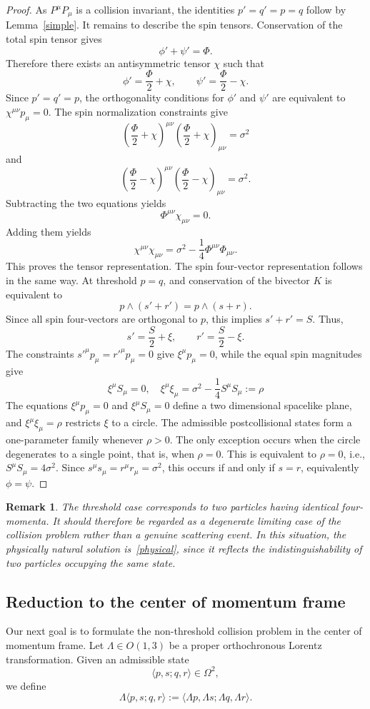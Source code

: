 \documentclass[10pt,a4paper]{amsart}
\newtheorem{remark}[theorem]{Remark}
\begin{document}
\begin{proof}
As $P^\mu P_\mu$ is a collision invariant, the identities $p'=q'=p=q$ follow by Lemma~\ref{simple}. 
It remains to describe the spin tensors. Conservation of the total spin tensor gives
\[
\phi'+\psi'=\Phi.
\]
Therefore there exists an antisymmetric tensor $\chi$ such that
\[
\phi'=\frac{\Phi}{2}+\chi,
\qquad
\psi'=\frac{\Phi}{2}-\chi.
\]
Since $p'=q'=p$, the orthogonality conditions for $\phi'$ and $\psi'$ are equivalent to $\chi^{\mu\nu}p_\mu=0$. 
The spin normalization constraints give
\[
\left(\frac{\Phi}{2}+\chi\right)^{\mu\nu}
\left(\frac{\Phi}{2}+\chi\right)_{\mu\nu}
=
\sigma^2
\]
and
\[
\left(\frac{\Phi}{2}-\chi\right)^{\mu\nu}
\left(\frac{\Phi}{2}-\chi\right)_{\mu\nu}
=
\sigma^2.
\]
Subtracting the two equations yields
\[
\Phi^{\mu\nu}\chi_{\mu\nu}=0.
\]
Adding them yields
\[
\chi^{\mu\nu}\chi_{\mu\nu}
=
\sigma^2-\frac14\Phi^{\mu\nu}\Phi_{\mu\nu}.
\]
This proves the tensor representation.
The spin four-vector representation follows in the same way. At threshold $p=q$, and conservation of the bivector $K$ is equivalent to
\[
p\wedge(s'+r')=p\wedge(s+r).
\]
Since all spin four-vectors are orthogonal to $p$, this implies $s'+r'=S$.
Thus,
\[
s'=\frac{S}{2}+\xi,
\qquad
r'=\frac{S}{2}-\xi.
\]
The constraints $s'^\mu p_\mu=r'^\mu p_\mu=0$ give $\xi^\mu p_\mu=0$,
while the equal spin magnitudes give
\[
\xi^\mu S_\mu=0,\quad
\xi^\mu\xi_\mu
=
\sigma^2-\frac14 S^\mu S_\mu:=\rho
\]
The equations $\xi^\mu p_\mu=0$ and $\xi^\mu S_\mu=0$ define a two dimensional spacelike plane, and $\xi^\mu \xi_\mu=\rho$ restricts $\xi$ to a circle. The admissible postcollisional states form a one-parameter family whenever $\rho>0$. The only exception occurs when the circle degenerates to a single point, that is, when $\rho=0$. This is equivalent to $\rho=0$, i.e., $S^\mu S_\mu =4\sigma^2$. Since $s^\mu s_\mu=r^\mu r_\mu=\sigma^2$, this occurs if and only if $s=r$, equivalently $\phi=\psi$. 
\end{proof}
\begin{remark}
The threshold case corresponds to two particles having identical four-momenta. It should therefore be regarded as a degenerate limiting case of the collision problem rather than a genuine scattering event. In this situation, the physically natural solution is~\eqref{physical}, since it reflects the indistinguishability of two particles occupying the same state.
\end{remark}


\subsection{Reduction to the center of momentum frame}
Our next goal is to formulate the non-threshold collision problem in the center of momentum frame. 
Let $\Lambda\in O(1,3)$ be a proper orthochronous Lorentz transformation. Given an admissible state
\[
\langle p,s;q,r\rangle\in\Omega^2,
\]
we define
\[
\Lambda\langle p,s;q,r\rangle:=\langle\Lambda p,\Lambda s;\Lambda q,\Lambda r\rangle.
\]
\end{document}
